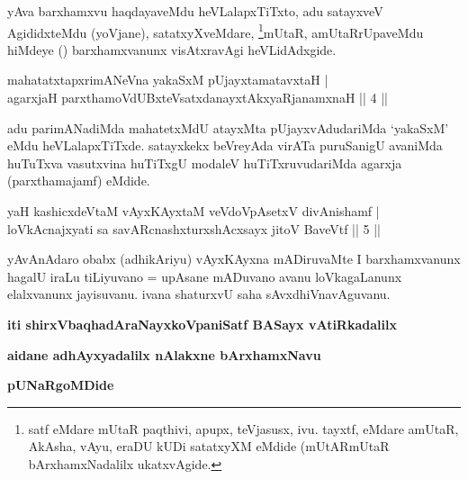 \begin{artha}
yAva barxhamxvu haqdayaveMdu heVLalapxTiTxto, adu satayxveV AgididxteMdu (yoVjane), satatxyXveMdare, \footnote{satf eMdare mUtaR paqthivi, apupx, teVjasusx, ivu. tayxtf, eMdare amUtaR, AkAsha, vAyu, eraDU kUDi satatxyXM eMdide (mUtARmUtaR bArxhamxNadalilx ukatxvAgide.}mUtaR, amUtaRrUpaveMdu hiMdeye (\quad) barxhamxvanunx visAtxravAgi heVLidAdxgide.
\end{artha}

\begin{shl}
mahatatxtapxrimANeVna yakaSxM pUjayxtamatavxtaH | \\
agarxjaH parxthamoVdUBxteVsatxdanayxtAkxyaRjanamxnaH \hfill ||  4 || 
\end{shl}

\begin{artha}
adu parimANadiMda mahatetxMdU atayxMta pUjayxvAdudariMda `yakaSxM' eMdu heVLalapxTiTxde. satayxkekx beVreyAda virATa puruSanigU avaniMda huTuTxva vasutxvina huTiTxgU modaleV huTiTxruvudariMda agarxja (parxthamajamf) eMdide.
\end{artha}


\begin{shl}
yaH kashicxdeVtaM vAyxKAyxtaM veVdoVpAsetxV divAnishamf | \\
loVkAcnajxyati sa savARcnashxturxshAcxsayx jitoV BaveVtf \hfill ||  5 ||
\end{shl}

\begin{artha}
yAvAnAdaro obabx (adhikAriyu) vAyxKAyxna mADiruvaMte I barxhamxvanunx hagalU iraLu tiLiyuvano = upAsane mADuvano avanu loVkagaLanunx elalxvanunx jayisuvanu. ivana shaturxvU saha sAvxdhiVnavAguvanu.
\end{artha}

\begin{center}
{\bf iti shirxVbaqhadAraNayxkoVpaniSatf BASayx vAtiRkadalilx}
\smallskip

{\bf aidane adhAyxyadalilx nAlakxne bArxhamxNavu}

\smallskip
{\bf pUNaRgoMDide}
\end{center}
